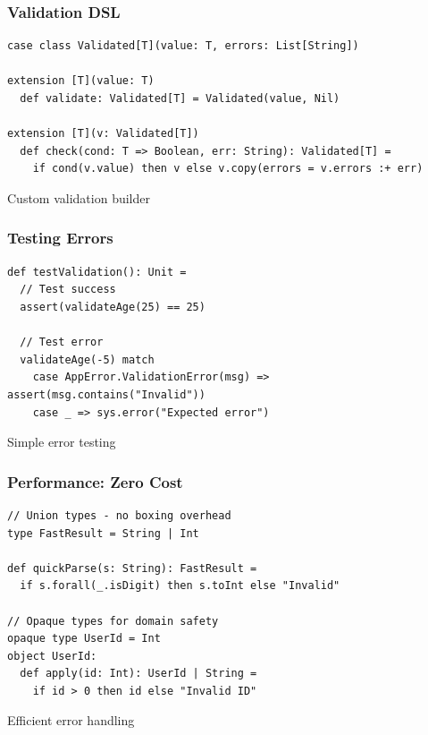 \documentclass{beamer}
\begin{document}
\begin{frame}[fragile]
\frametitle{Validation DSL}

\begin{lstlisting}[style=scalaStyle]
case class Validated[T](value: T, errors: List[String])

extension [T](value: T)
  def validate: Validated[T] = Validated(value, Nil)

extension [T](v: Validated[T])
  def check(cond: T => Boolean, err: String): Validated[T] =
    if cond(v.value) then v else v.copy(errors = v.errors :+ err)
\end{lstlisting}

Custom validation builder

\end{frame}

\begin{frame}[fragile]
\frametitle{Testing Errors}

\begin{lstlisting}[style=scalaStyle]
def testValidation(): Unit =
  // Test success
  assert(validateAge(25) == 25)
  
  // Test error
  validateAge(-5) match
    case AppError.ValidationError(msg) => assert(msg.contains("Invalid"))
    case _ => sys.error("Expected error")
\end{lstlisting}

Simple error testing

\end{frame}

\begin{frame}[fragile]
\frametitle{Performance: Zero Cost}

\begin{lstlisting}[style=scalaStyle]
// Union types - no boxing overhead
type FastResult = String | Int

def quickParse(s: String): FastResult =
  if s.forall(_.isDigit) then s.toInt else "Invalid"

// Opaque types for domain safety
opaque type UserId = Int
object UserId:
  def apply(id: Int): UserId | String = 
    if id > 0 then id else "Invalid ID"
\end{lstlisting}

Efficient error handling

\end{frame}
\end{document}
